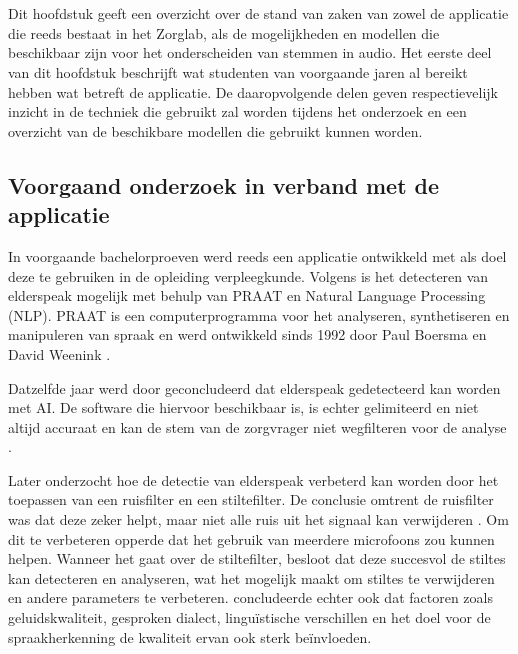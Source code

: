 \chapter{}%
\label{ch:stand-van-zaken}



Dit hoofdstuk geeft een overzicht over de stand van zaken van zowel de applicatie die reeds bestaat in het Zorglab, als de mogelijkheden en modellen die beschikbaar zijn voor het onderscheiden van stemmen in audio.
Het eerste deel van dit hoofdstuk beschrijft wat studenten van voorgaande jaren al bereikt hebben wat betreft de applicatie. De daaropvolgende delen geven respectievelijk inzicht in de techniek die gebruikt zal worden tijdens het onderzoek en een overzicht van de beschikbare modellen die gebruikt kunnen worden. 

\section{Voorgaand onderzoek in verband met de applicatie}%
In voorgaande bachelorproeven werd reeds een applicatie ontwikkeld met als doel deze te gebruiken in de opleiding verpleegkunde. Volgens \textcite{Govaerts2022} is het detecteren van elderspeak mogelijk met behulp van PRAAT en Natural Language Processing (NLP). PRAAT is een computerprogramma voor het analyseren, synthetiseren en manipuleren van spraak en werd ontwikkeld sinds 1992 door Paul Boersma en David Weenink \autocite{Govaerts2022}.

Datzelfde jaar werd door \textcite{Gussem2022} geconcludeerd dat elderspeak gedetecteerd kan worden met AI. De software die hiervoor beschikbaar is, is echter gelimiteerd en niet altijd accuraat en kan de stem van de zorgvrager niet wegfilteren voor de analyse \autocite{Gussem2022}.

Later onderzocht \textcite{Daems2023} hoe de detectie van elderspeak verbeterd kan worden door het toepassen van een ruisfilter en een stiltefilter. De conclusie omtrent de ruisfilter was dat deze zeker helpt, maar niet alle ruis uit het signaal kan verwijderen \autocite{Daems2023}. Om dit te verbeteren opperde \textcite{Daems2023} dat het gebruik van meerdere microfoons zou kunnen helpen.
Wanneer het gaat over de stiltefilter, besloot \textcite{Daems2023} dat deze succesvol de stiltes kan detecteren en analyseren, wat het mogelijk maakt om stiltes te verwijderen en andere parameters te verbeteren. \textcite{Daems2023} concludeerde echter ook dat factoren zoals geluidskwaliteit, gesproken dialect, linguïstische verschillen en het doel voor de spraakherkenning de kwaliteit ervan ook sterk beïnvloeden.

